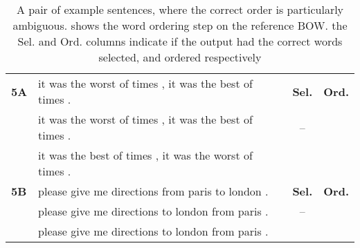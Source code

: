 \documentclass[class=article]{standalone}
\newcommand{\cmark}{\ding{51}}%
\newcommand{\xmark}{\ding{55}}%
\newcommand{\passmark}{--}
\begin{document}
	
	\begin{table}
		\small
		\begin{tabular}{ p{\collenone} p{\collentwo} C{\collenthree} C{\collenthree} }
			
			\textbf{5A \hfill {}}  & it was the worst of times , it was the best of times . & \textbf{Sel.} & \textbf{Ord.} \\
			\textbf{\oracletitle}  & it was the worst of times , it was the best of times . & \passmark & \cmark \\
			\textbf{\twosteptitle}  & it was the best of times , it was the worst of times . & \cmark & \xmark \\
			\hline
			\textbf{5B \hfill {}}  & please give me directions from paris to london . & \textbf{Sel.} & \textbf{Ord.} \\
			\textbf{\oracletitle}  & please give me directions to london from paris . & \passmark & \xmark \\
			\textbf{\twosteptitle}  & please give me directions to london from paris . & \cmark & \xmark \\
			\hline
		\end{tabular}
		\caption{    \label{egordered} A pair of example sentences, where the correct order is particularly ambiguous. \oracletitle{}  shows the word ordering step on the reference BOW. the Sel. and Ord. columns indicate if the output had the correct words selected, and ordered respectively}
	\end{table}
	
	
	
	
	
	
\end{document}
